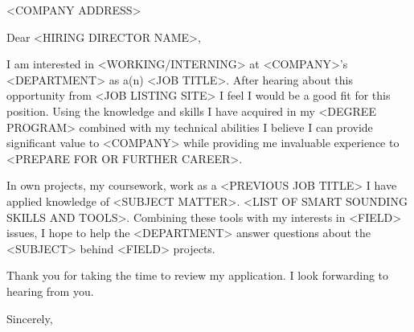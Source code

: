 \documentclass[11pt,letterpaper]{letter}
\begin{document}
\begin{letter}{<COMPANY ADDRESS> }
\address{<YOUR ADDRESS>}

\opening{Dear <HIRING DIRECTOR NAME>,}

I am interested in <WORKING/INTERNING> at <COMPANY>'s <DEPARTMENT> as a(n) <JOB TITLE>. After hearing about this opportunity from <JOB LISTING SITE> I feel I would be a good fit for this position. Using the knowledge and skills I have acquired in my <DEGREE PROGRAM> combined with my technical abilities I believe I can provide significant value to <COMPANY> while providing me invaluable experience to <PREPARE FOR OR FURTHER CAREER>.

In own projects, my coursework, work as a <PREVIOUS JOB TITLE> I have applied knowledge of <SUBJECT MATTER>. <LIST OF SMART SOUNDING SKILLS AND TOOLS>. Combining these tools with my interests in <FIELD> issues, I hope to help the <DEPARTMENT> answer questions about the <SUBJECT> behind <FIELD> projects. 

Thank you for taking the time to review my application. I look forwarding to hearing from you.

\signature{\vspace{-35pt}
	<YOUR NAME HERE>}
\closing{Sincerely,}\







\end{letter}
\end{document}
